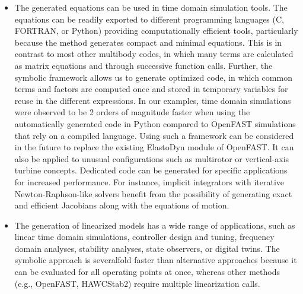 \documentclass[wes, manuscript]{copernicus}
\begin{document}
\begin{itemize}
\item The generated equations can be used in time domain simulation tools.
The equations can be readily exported to different programming languages (C, FORTRAN, or Python)  providing computationally efficient tools, particularly because the method generates compact and minimal equations.
This is in contrast to most other multibody codes, in which many terms are calculated as matrix equations and through successive function calls.
Further, the symbolic framework allows us to generate optimized code, in which common terms and factors are computed once and stored in temporary variables for reuse in the different expressions.
%
In our examples, time domain simulations were observed to be 2 orders of magnitude faster when using the automatically generated code in Python compared to OpenFAST simulations that rely on a compiled language. 
%
Using such a framework can be considered in the future to replace the existing ElastoDyn module of OpenFAST.
It can also be applied to unusual configurations such as multirotor or vertical-axis turbine concepts. 
%
Dedicated code can be generated for specific applications for increased performance.
For instance, implicit integrators with iterative Newton-Raphson-like solvers benefit from the possibility of generating exact and efficient Jacobians along with the equations of motion.


\item The generation of linearized models has a wide range of applications, such as linear time domain simulations, controller design and tuning, frequency domain analyses, stability analyses, state observers, or digital twins.
The symbolic approach is severalfold faster than alternative approaches because it can be evaluated for all operating points at once, whereas other methods (e.g., OpenFAST, HAWCStab2) require multiple linearization calls.


\end{itemize}
\end{document}
